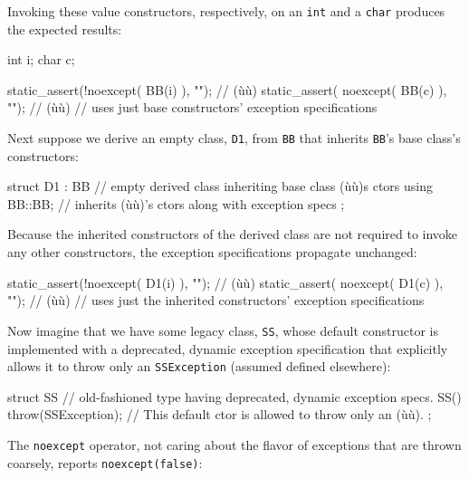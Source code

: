 \noindent Invoking these value constructors, respectively, on an \lstinline!int! and
a \lstinline!char! produces the expected results:

\begin{emcppslisting}
int i;
char c;

static_assert(!noexcept( BB(i) ), "");  // (ù{}ù)
static_assert( noexcept( BB(c) ), "");  // (ù{}ù)
    // uses just base constructors' exception specifications
\end{emcppslisting}
    

\noindent Next suppose we derive an empty class, \lstinline!D1!, from \lstinline!BB!
that inherits \lstinline!BB!'s base class's constructors:

\begin{emcppslisting}
struct D1 : BB  // empty derived class inheriting base class (ù{}ù)s ctors
{
    using BB::BB;  // inherits (ù{}ù)'s ctors along with exception specs
};
\end{emcppslisting}
    

\noindent Because the inherited constructors of the derived class are not required
to invoke any other constructors, the exception specifications propagate
unchanged:

\begin{emcppslisting}
static_assert(!noexcept( D1(i) ), "");  // (ù{}ù)
static_assert( noexcept( D1(c) ),  "");  // (ù{}ù)
    // uses just the inherited constructors' exception specifications
\end{emcppslisting}
    

\noindent Now imagine that we have some legacy class, \lstinline!SS!, whose default
constructor is implemented with a deprecated, dynamic exception
specification that explicitly allows it to throw only an
\lstinline!SSException! (assumed defined elsewhere):

\begin{emcppslisting}
struct SS  // old-fashioned type having deprecated, dynamic exception specs.
{
    SS() throw(SSException);  // This default ctor is allowed to throw only an (ù{}ù).
};
\end{emcppslisting}
    

\noindent The \lstinline!noexcept! operator, not caring about the flavor of
exceptions that are thrown coarsely, reports \lstinline!noexcept(false)!:

